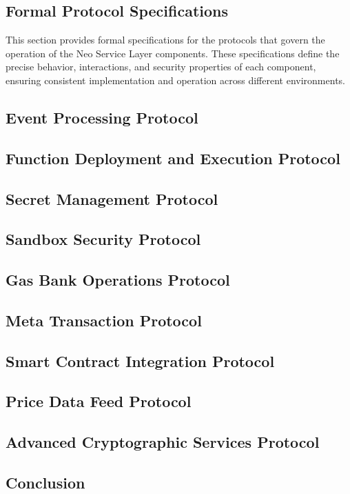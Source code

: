 \documentclass[12pt,a4paper]{article}
\begin{document}
\subsection{Formal Protocol Specifications}
\label{subsec:formal-protocols}

This section provides formal specifications for the protocols that govern the operation of the Neo Service Layer components. These specifications define the precise behavior, interactions, and security properties of each component, ensuring consistent implementation and operation across different environments.

\subsection{Event Processing Protocol}
\label{subsec:event-protocol}

\subsection{Function Deployment and Execution Protocol}
\label{subsec:function-protocol}

\subsection{Secret Management Protocol}
\label{subsec:secret-protocol}

\subsection{Sandbox Security Protocol}
\label{subsec:sandbox-protocol}

\subsection{Gas Bank Operations Protocol}
\label{subsec:gas-bank-protocol}

\subsection{Meta Transaction Protocol}
\label{subsec:meta-tx-protocol}

\subsection{Smart Contract Integration Protocol}
\label{subsec:smart-contract-protocol}

\subsection{Price Data Feed Protocol}
\label{subsec:price-feed-protocol}

\subsection{Advanced Cryptographic Services Protocol}
\label{subsec:advanced-crypto-protocol}

\subsection{Conclusion}
\label{subsec:nsl-conclusion}
\end{document}
